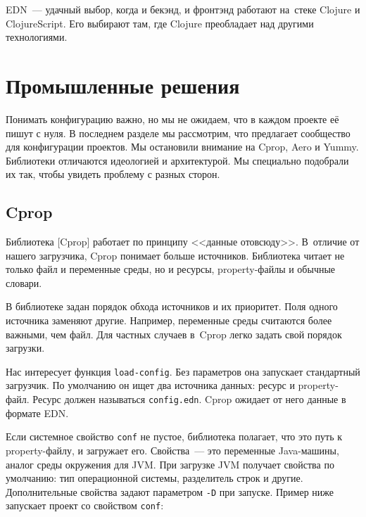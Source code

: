 EDN~--- удачный выбор, когда и бекэнд, и фронтэнд работают на~стеке Clojure и
ClojureScript. Его выбирают там, где Clojure преобладает над другими
технологиями.



\section{Промышленные решения}

Понимать конфигурацию важно, но мы не ожидаем, что в каждом проекте её пишут с
нуля. В последнем разделе мы рассмотрим, что предлагает сообщество для
конфигурации проектов. Мы остановили внимание на Cprop, Aero и Yummy. Библиотеки
отличаются идеологией и архитектурой. Мы специально подобрали их так, чтобы
увидеть проблему с разных сторон.

\subsection{Cprop}


Библиотека [Cprop] работает по
принципу <<данные отовсюду>>. В~отличие от нашего загрузчика, Cprop понимает
больше источников. Библиотека читает не только файл и переменные среды, но и
ресурсы, property-файлы и обычные словари.

В библиотеке задан порядок обхода источников и их приоритет. Поля одного
источника заменяют другие. Например, переменные среды считаются более важными,
чем файл. Для частных случаев в~Cprop легко задать свой порядок загрузки.

Нас интересует функция \verb|load-config|. Без параметров она запускает
стандартный загрузчик. По умолчанию он ищет два источника данных: ресурс и
property-файл. Ресурс должен называться \verb|config.edn|. Cprop ожидает от него
данные в формате EDN.

Если системное свойство \verb|conf| не пустое, библиотека полагает, что это путь
к property-файлу, и загружает его. Свойства~--- это переменные Java-машины,
аналог среды окружения для JVM. При загрузке JVM получает свойства по умолчанию:
тип операционной системы, разделитель строк и другие. Дополнительные свойства
задают параметром \verb|-D| при запуске. Пример ниже запускает проект со
свойством \verb|conf|:


\ifx\DEVICETYPE\MOBILE

